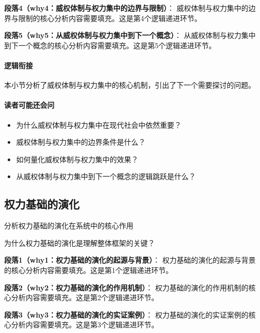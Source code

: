 \documentclass[../main.tex]{subfiles}
\begin{document}
{{\textbf{段落4（why4：威权体制与权力集中的边界与限制）}：
威权体制与权力集中的边界与限制的核心分析内容需要填充。这是第4个逻辑递进环节。


\textbf{段落5（why5：从威权体制与权力集中到下一个概念）}：
从威权体制与权力集中到下一个概念的核心分析内容需要填充。这是第5个逻辑递进环节。


\paragraph*{逻辑衔接}
本小节分析了威权体制与权力集中的核心机制，引出了下一个需要探讨的问题。

\paragraph*{读者可能还会问}
\begin{itemize}
\item 为什么威权体制与权力集中在现代社会中依然重要？
\item 威权体制与权力集中的边界条件是什么？
\item 如何量化威权体制与权力集中的效果？
\item 从威权体制与权力集中到下一个概念的逻辑跳跃是什么？
\end{itemize}


\subsection{权力基础的演化}

\begin{motivation}
分析权力基础的演化在系统中的核心作用
\end{motivation}

\begin{logicmap}
[逻辑链占位]
\end{logicmap}

\begin{questionbox}
为什么权力基础的演化是理解整体框架的关键？
\end{questionbox}

\textbf{段落1（why1：权力基础的演化的起源与背景）}：
权力基础的演化的起源与背景的核心分析内容需要填充。这是第1个逻辑递进环节。


\textbf{段落2（why2：权力基础的演化的作用机制）}：
权力基础的演化的作用机制的核心分析内容需要填充。这是第2个逻辑递进环节。


\textbf{段落3（why3：权力基础的演化的实证案例）}：
权力基础的演化的实证案例的核心分析内容需要填充。这是第3个逻辑递进环节。


}}
\end{document}
